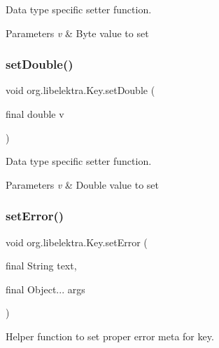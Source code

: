 Data type specific setter function. 


\begin{DoxyParams}{Parameters}
{\em v} & Byte value to set \\
\hline
\end{DoxyParams}
\mbox{\label{classorg_1_1libelektra_1_1Key_a2c411133e9a8d13df30d08041678a5a0}} 
\subsubsection{\texorpdfstring{set\+Double()}{setDouble()}}
{\footnotesize\ttfamily void org.\+libelektra.\+Key.\+set\+Double (\begin{DoxyParamCaption}\item[{final double}]{v }\end{DoxyParamCaption})\hspace{0.3cm}{\ttfamily [inline]}}



Data type specific setter function. 


\begin{DoxyParams}{Parameters}
{\em v} & Double value to set \\
\hline
\end{DoxyParams}
\mbox{\label{classorg_1_1libelektra_1_1Key_a1f71503902725f238f81a1211eb5d9d5}} 
\subsubsection{\texorpdfstring{set\+Error()}{setError()}}
{\footnotesize\ttfamily void org.\+libelektra.\+Key.\+set\+Error (\begin{DoxyParamCaption}\item[{final String}]{text,  }\item[{final Object...}]{args }\end{DoxyParamCaption})\hspace{0.3cm}{\ttfamily [inline]}}



Helper function to set proper error meta for key. 


